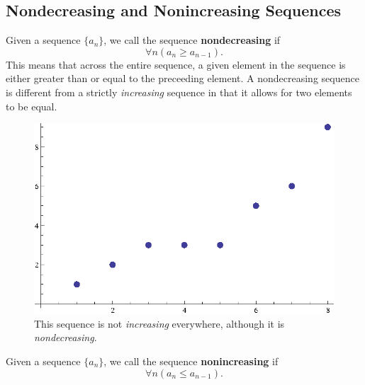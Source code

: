 \subsection{Nondecreasing and Nonincreasing Sequences}\label{nondecreasing}
\begin{defn}
  Given a sequence \(\{a_n\}\), we call the sequence \textbf{nondecreasing} if
  \[\forall n (a_n \geq a_{n-1}).\]
  This means that across the entire sequence, a given element in the sequence is either greater than or equal to the preceeding element.
  A nondecreasing sequence is different from a strictly \emph{increasing} sequence in that it allows for two elements to be equal.
  \begin{figure}[H]
    \begin{center}
      \includegraphics[scale=0.5]{continuous/sequence/nondecreasing}
    \end{center}
    \caption{This sequence is not \emph{increasing} everywhere, although it is \emph{nondecreasing}.}
  \end{figure}
\end{defn}
\begin{defn}
  Given a sequence \(\{a_n\}\), we call the sequence \textbf{nonincreasing} if
  \[\forall n (a_n \leq a_{n-1}).\]
\end{defn}
